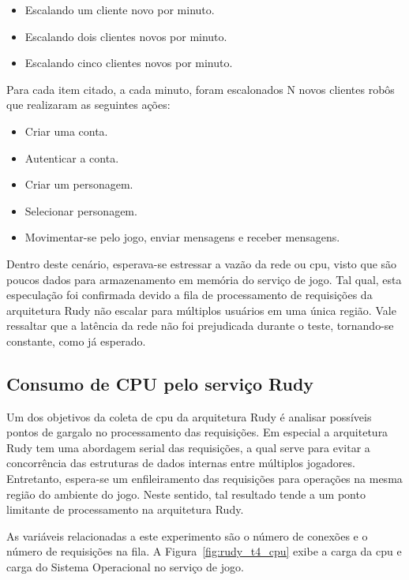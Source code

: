 \begin{itemize}
 \item Escalando um cliente novo por minuto.
 \item Escalando dois clientes novos por minuto.
 \item Escalando cinco clientes novos por minuto.
\end{itemize}

Para cada item citado, a cada minuto, foram escalonados N novos clientes robôs que realizaram as seguintes ações:

\begin{itemize}
 \item Criar uma conta.
 \item Autenticar a conta.
 \item Criar um personagem.
 \item Selecionar personagem.
 \item Movimentar-se pelo jogo, enviar mensagens e receber mensagens. %
\end{itemize}

Dentro deste cenário, esperava-se estressar a vazão da rede ou \ac{cpu}, visto que são poucos dados para armazenamento em memória do serviço de jogo.
%
Tal qual, esta especulação foi confirmada devido a fila de processamento de requisições da arquitetura Rudy não escalar para múltiplos usuários em uma única região.
%
Vale ressaltar que a latência da rede não foi prejudicada durante o teste, tornando-se constante, como já esperado.


\subsection{Consumo de CPU pelo serviço Rudy}

Um dos objetivos da coleta de \ac{cpu} da arquitetura Rudy é analisar possíveis pontos de gargalo no processamento das requisições.
%
Em especial a arquitetura Rudy tem uma abordagem serial das requisições, a qual serve para evitar a concorrência das estruturas de dados internas entre múltiplos jogadores.
%
Entretanto, espera-se um enfileiramento das requisições para operações na mesma região do ambiente do jogo.
%
Neste sentido, tal resultado tende a um ponto limitante de processamento na arquitetura Rudy.

As variáveis relacionadas a este experimento são o número de conexões e o número de requisições na fila.
%
A Figura~\ref{fig:rudy_t4_cpu} exibe a carga da \ac{cpu} e carga do Sistema Operacional no serviço de jogo.



